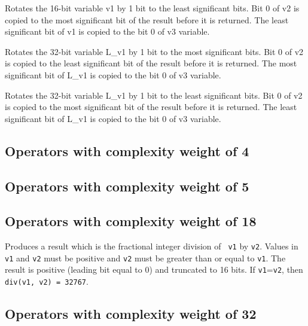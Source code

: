 Rotates the 16-bit variable v1 by 1 bit to the least significant
bits. Bit 0 of v2 is copied to the most significant bit of the
result before it is returned. The least significant bit of v1 is
copied to the bit 0 of v3 variable.


 

Rotates the 32-bit variable L\_v1 by 1 bit to the most significant
bits. Bit 0 of v2 is copied to the least significant bit of the
result before it is returned. The most significant bit of L\_v1 is
copied to the bit 0 of v3 variable.


 

Rotates the 32-bit variable L\_v1 by 1 bit to the least significant bits.
Bit 0 of v2 is copied to the most significant bit of the result before it is returned.
The least significant bit of L\_v1 is copied to the bit 0 of v3 variable.


\subsection{Operators with complexity weight of 4}


\enlargethispage*{10mm}

\subsection{Operators with complexity weight of 5}

\subsection{Operators with complexity weight of 18}



Produces a result which is the fractional integer division of {\tt
v1} by {\tt v2}. Values in {\tt v1} and {\tt v2} must be positive
and {\tt v2} must be greater than or equal to {\tt v1}. The result
is positive (leading bit equal to 0) and truncated to 16 bits. If
{\tt v1}={\tt v2}, then {\tt div(v1, v2) = 32767}.

\subsection{Operators with complexity weight of 32}


